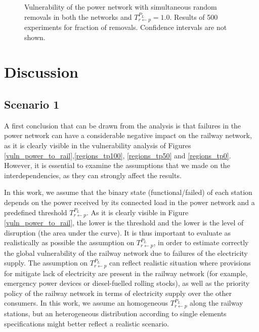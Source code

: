 \documentclass[review]{elsarticle}
\begin{document}
\begin{figure}[h]
	\centering
	\caption{Vulnerability of the power network with simultaneous random removals in both the networks and $T_{r \leftarrow p}^{P_L}=1.0$. Results of 500 experiments for fraction of removals. Confidence intervals are not shown.}
	\label{vuln_power_ccf_100}
\end{figure}






\section{Discussion}
\subsection{Scenario 1}

	A first conclusion that can be drawn from the analysis is that failures in the power network can have a considerable negative impact on the railway network, as it is clearly visible in the vulnerability analysis of Figures \ref{vuln_power_to_rail},\ref{regions_tp100}, \ref{regions_tp50} and \ref{regions_tp0}. However, it is essential to examine the assumptions that we made on the interdependencies, as they can strongly affect the results.
	
	In this work, we assume that the binary state (functional/failed) of each station depends on the power received by its connected load in the power network and a predefined threshold $T_{r \leftarrow p}^{P_L}$. As it is clearly visible in Figure \ref{vuln_power_to_rail}, the lower is the threshold and the lower is the level of disruption (the area under the curve). It is thus important to evaluate as realistically as possible the assumption on $T_{r \leftarrow p}^{P_L}$, in order to estimate correctly the global vulnerability of the railway network due to failures of the electricity supply. The assumption on $T_{r \leftarrow p}^{P_L}$ can reflect realistic situation where provisions for mitigate lack of electricity are present in the railway network (for example, emergency power devices or diesel-fuelled rolling stocks), as well as the priority policy of the railway network in terms of electricity supply over the other consumers. In this work, we assume an homogeneous $T_{r \leftarrow p}^{P_L}$ along the railway stations, but an heterogeneous distribution according to single elements specifications might better reflect a realistic scenario.
\end{document}
